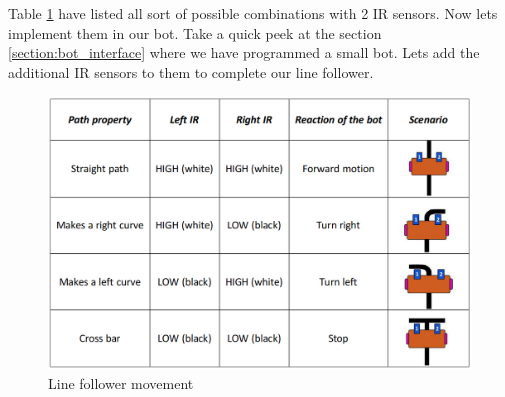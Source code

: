Table \ref{fig:line_follower_move} have listed all sort of possible combinations with 2 \ac{IR} sensors. Now lets implement them in our bot. Take a quick peek at the section \ref{section:bot_interface} where we have programmed a small bot. Lets add the additional \ac{IR} sensors to them to complete our line follower.


\begin{figure}
    \centering
    \includegraphics{Tables/IR Sensor/line_follower_move.png}
    \caption{Line follower movement}
    \label{fig:line_follower_move}
\end{figure}

